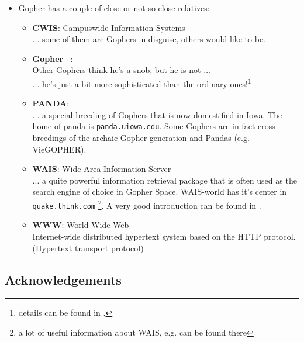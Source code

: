 \begin{itemize}
\item Gopher has a couple of close or not so close relatives:
\begin{itemize}
\item {\bf CWIS}: Campuswide Information Systems\\
      ... some of them are Gophers in disguise, others would like to be.
\item {\bf Gopher+}:\\
      Other Gophers think he's a snob, but he is not $\ldots$\\
      ... he's just a bit more sophisticated than the ordinary
      ones!\footnote{details can be found in \cite{gophplus}.}
\item {\bf PANDA}:\\
      ... a special breeding of Gophers that is now domestified in Iowa.
      The home of panda is {\tt panda.uiowa.edu}.  Some Gophers are
      in fact cross-breedings of the archaic Gopher generation and
      Pandas (e.g. VieGOPHER).
\item {\bf WAIS}: Wide Area Information Server\\
      ... a quite powerful information retrieval package that is often
      used as the search engine of choice in Gopher Space.
      WAIS-world has it's center in
      {\tt quake.think.com} \footnote{a lot of useful information about WAIS,
      e.g. \cite{WAIS1} can be found there}.
      A very good introduction can be found in \cite{WAIS.intro}.
\item {\bf WWW}: World-Wide Web\\
      Internet-wide distributed hypertext system based on the
      HTTP protocol.  (Hypertext transport protocol)
\end{itemize}

\end{itemize}
 


\subsection{Acknowledgements}
 

